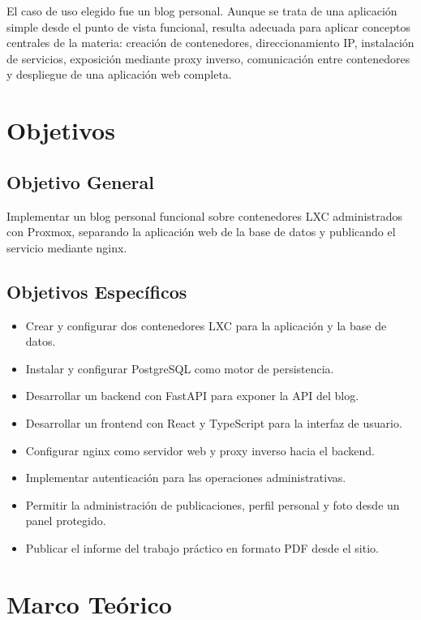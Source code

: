 \documentclass[twoside, 11pt, a4paper]{article}
\begin{document}
    El caso de uso elegido fue un blog personal. Aunque se trata de una aplicación simple desde el punto de vista funcional, resulta adecuada para aplicar conceptos centrales de la materia: creación de contenedores, direccionamiento IP, instalación de servicios, exposición mediante proxy inverso, comunicación entre contenedores y despliegue de una aplicación web completa.

    \section{Objetivos}

    \subsection{Objetivo General}

    Implementar un blog personal funcional sobre contenedores LXC administrados con Proxmox, separando la aplicación web de la base de datos y publicando el servicio mediante nginx.

    \subsection{Objetivos Específicos}

    \begin{itemize}
        \item Crear y configurar dos contenedores LXC para la aplicación y la base de datos.
        \item Instalar y configurar PostgreSQL como motor de persistencia.
        \item Desarrollar un backend con FastAPI para exponer la API del blog.
        \item Desarrollar un frontend con React y TypeScript para la interfaz de usuario.
        \item Configurar nginx como servidor web y proxy inverso hacia el backend.
        \item Implementar autenticación para las operaciones administrativas.
        \item Permitir la administración de publicaciones, perfil personal y foto desde un panel protegido.
        \item Publicar el informe del trabajo práctico en formato PDF desde el sitio.
    \end{itemize}

    \section{Marco Teórico}
\end{document}
